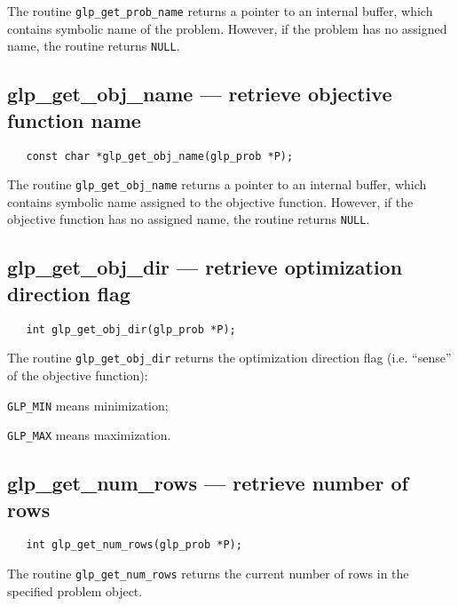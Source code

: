 \returns

The routine \verb|glp_get_prob_name| returns a pointer to an internal
buffer, which contains symbolic name of the problem. However, if the
problem has no assigned name, the routine returns \verb|NULL|.

\subsection{glp\_get\_obj\_name --- retrieve objective function name}

\synopsis

\begin{verbatim}
   const char *glp_get_obj_name(glp_prob *P);
\end{verbatim}

\returns

The routine \verb|glp_get_obj_name| returns a pointer to an internal
buffer, which contains symbolic name assigned to the objective
function. However, if the objective function has no assigned name, the
routine returns \verb|NULL|.

\subsection{glp\_get\_obj\_dir --- retrieve optimization direction
flag}

\synopsis

\begin{verbatim}
   int glp_get_obj_dir(glp_prob *P);
\end{verbatim}

\returns

The routine \verb|glp_get_obj_dir| returns the optimization direction
flag (i.e. ``sense'' of the objective function):

\verb|GLP_MIN| means minimization;

\verb|GLP_MAX| means maximization.

\subsection{glp\_get\_num\_rows --- retrieve number of rows}

\synopsis

\begin{verbatim}
   int glp_get_num_rows(glp_prob *P);
\end{verbatim}

\returns

The routine \verb|glp_get_num_rows| returns the current number of rows
in the specified problem object.

